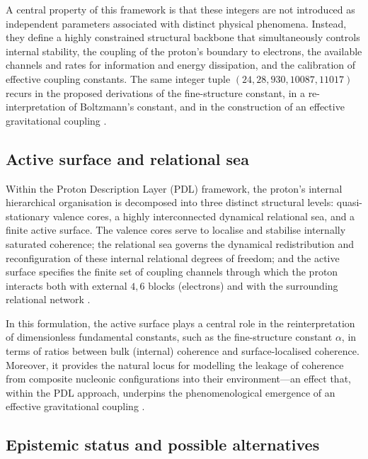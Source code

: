 \documentclass[11pt,a4paper]{article}
\begin{document}
A central property of this framework is that these integers are not introduced as independent parameters associated with distinct physical phenomena. Instead, they define a highly constrained structural backbone that simultaneously controls internal stability, the coupling of the proton’s boundary to electrons, the available channels and rates for information and energy dissipation, and the calibration of effective coupling constants. The same integer tuple \((24,28,930,10087,11017)\) recurs in the proposed derivations of the fine-structure constant, in a re-interpretation of Boltzmann’s constant, and in the construction of an effective gravitational coupling \citep{PDL_intro,Alpha_PDL_v2_2026,Born_Golden_v2_2026}.

\subsection{Active surface and relational sea}
\label{subsec:active_surface}

Within the Proton Description Layer (PDL) framework, the proton’s internal hierarchical organisation is decomposed into three distinct structural levels: quasi-stationary valence cores, a highly interconnected dynamical relational sea, and a finite active surface. The valence cores serve to localise and stabilise internally saturated coherence; the relational sea governs the dynamical redistribution and reconfiguration of these internal relational degrees of freedom; and the active surface specifies the finite set of coupling channels through which the proton interacts both with external \(4,6\) blocks (electrons) and with the surrounding relational network
\citep{PDL_Main_2026,Born_Golden_v2_2026}.

In this formulation, the active surface plays a central role in the reinterpretation of dimensionless fundamental constants, such as the fine-structure constant \(\alpha\), in terms of ratios between bulk (internal) coherence and surface-localised coherence. Moreover, it provides the natural locus for modelling the leakage of coherence from composite nucleonic configurations into their environment—an effect that, within the PDL approach, underpins the phenomenological emergence of an effective gravitational coupling
\citep{Alpha_PDL_v2_2026,Exponent_18_PDL_2026}.

\subsection{Epistemic status and possible alternatives}
\label{subsec:proton_status}
\end{document}
